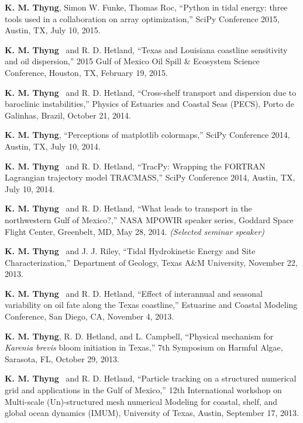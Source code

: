 \documentclass[10pt,letterpaper]{article}
\newcommand{\kmt}{\textbf{K. M. Thyng}}
\renewenvironment{itemize}{
  \begin{list}{}{
    \setlength{\leftmargin}{1.5em}
    \setlength{\itemsep}{0.25em}
    \setlength{\parskip}{0pt}
    \setlength{\parsep}{0.25em}
  }
}{
  \end{list}
}
\begin{document}
\begin{itemize}
\item \kmt, Simon W. Funke, Thomas Roc, ``Python in tidal energy: three tools used in a collaboration on array optimization,'' SciPy Conference 2015, Austin, TX, July 10, 2015.

\item \kmt~ and R. D. Hetland, ``Texas and Louisiana coastline sensitivity and oil dispersion,'' 2015 Gulf of Mexico Oil Spill \& Ecosystem Science Conference, Houston, TX, February 19, 2015.

\item \kmt~ and R. D. Hetland, ``Cross-shelf transport and dispersion due to baroclinic instabilities,'' Physics of Estuaries and Coastal Seas (PECS), Porto de Galinhas, Brazil, October 21, 2014.

\item \kmt, ``Perceptions of matplotlib colormaps,'' SciPy Conference 2014, Austin, TX, July 10, 2014.

\item \kmt~ and R. D. Hetland, ``TracPy: Wrapping the FORTRAN Lagrangian trajectory model TRACMASS,'' SciPy Conference 2014, Austin, TX, July 10, 2014.

\item \kmt~ and R. D. Hetland, ``What leads to transport in the northwestern Gulf of Mexico?,'' NASA MPOWIR speaker series, Goddard Space Flight Center, Greenbelt, MD, May 28, 2014. \textit{(Selected seminar speaker)}

\item \kmt~ and J. J. Riley, ``Tidal Hydrokinetic Energy and Site Characterization,'' Department of Geology, Texas A\&M University, November 22, 2013.

\item \kmt~ and R. D. Hetland, ``Effect of interannual and seasonal variability on oil fate along the Texas coastline,'' Estuarine and Coastal Modeling Conference, San Diego, CA, November 4, 2013.

\item \kmt, R. D. Hetland, and L. Campbell, ``Physical mechanism for \textit{Karenia brevis} bloom initiation in Texas,'' 7th Symposium on Harmful Algae, Sarasota, FL, October 29, 2013.

\item \kmt~ and R. D. Hetland, ``Particle tracking on a structured numerical grid and applications in the Gulf of Mexico,'' 12th International workshop on Multi-scale (Un)-structured mesh numerical Modeling for coastal, shelf, and global ocean dynamics (IMUM), University of Texas, Austin, September 17, 2013.


\end{itemize}
\end{document}
